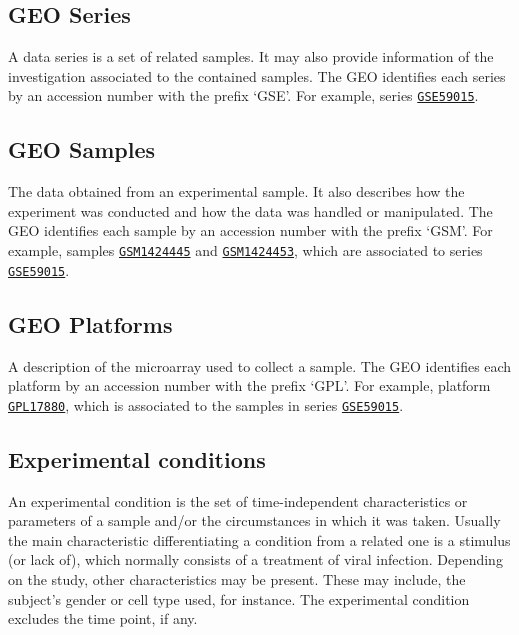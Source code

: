 \documentclass[final,letterpaper,12pt]{article}
\begin{document}
\subsection{GEO Series}

\par A data series is a set of related samples. It may also provide information of the investigation associated to the contained samples. The GEO identifies each series by an accession number with the prefix `GSE'. For example, series \href{https://www.ncbi.nlm.nih.gov/geo/query/acc.cgi?acc=GSE59015}{\texttt{GSE59015}}.

\subsection{GEO Samples}

\par The data obtained from an experimental sample. It also describes how the experiment was conducted and how the data was handled or manipulated. The GEO identifies each sample by an accession number with the prefix `GSM'. For example, samples \href{https://www.ncbi.nlm.nih.gov/geo/query/acc.cgi?acc=GSM1424445}{\texttt{GSM1424445}} and \href{https://www.ncbi.nlm.nih.gov/geo/query/acc.cgi?acc=GSM1424453}{\texttt{GSM1424453}}, which are associated to series \href{https://www.ncbi.nlm.nih.gov/geo/query/acc.cgi?acc=GSE59015}{\texttt{GSE59015}}.

\subsection{GEO Platforms}

\par A description of the microarray used to collect a sample. The GEO identifies each platform by an accession number with the prefix `GPL'. For example, platform \href{https://www.ncbi.nlm.nih.gov/geo/query/acc.cgi?acc=GPL17880}{\texttt{GPL17880}}, which is associated to the samples in series  \href{https://www.ncbi.nlm.nih.gov/geo/query/acc.cgi?acc=GSE59015}{\texttt{GSE59015}}.

\subsection{Experimental conditions}
\label{subsection:expconds}

\par An experimental condition is the set of time-independent characteristics or parameters of a sample and/or the circumstances in which it was taken. Usually the main characteristic differentiating a condition from a related one is a stimulus (or lack of), which normally consists of a treatment of viral infection. Depending on the study, other characteristics may be present. These may include, the subject’s gender or cell type used, for instance. The experimental condition excludes the time point, if any.
\end{document}
